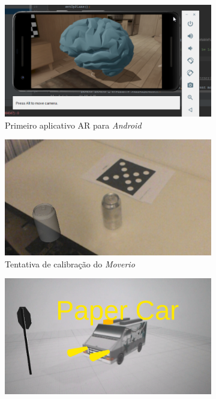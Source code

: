 \begin{figure}[ht]
\centering
    \begin{subfigure}{0.45\textwidth}
        \centering
        \includegraphics[width=.95\textwidth]{figuras/sceneform.png}
        \caption{Primeiro aplicativo AR para \textit{Android}}
        \label{fig:sceneform}
    \end{subfigure}
    \begin{subfigure}{0.45\textwidth}
        \centering
        \includegraphics[width=.95\linewidth]{figuras/Latinha-errada.png}
        \caption{Tentativa de calibração do \textit{Moverio}}
        \label{fig:latinha}
    \end{subfigure}
    \begin{subfigure}{0.45\textwidth}
        \centering
        \includegraphics[width=.95\textwidth]{figuras/PaperCarAR.png}

\end{subfigure}
\end{figure}
